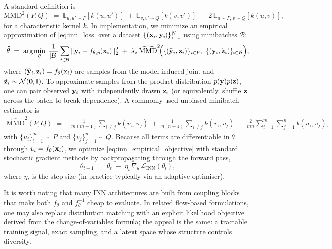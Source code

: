 A standard definition is
\begin{equation}
  \mathrm{MMD}^2(P,Q)
  \;=\;
  \mathbb{E}_{u,u'\sim P}[k(u,u')]
  \;+\;
  \mathbb{E}_{v,v'\sim Q}[k(v,v')]
  \;-\;
  2\,\mathbb{E}_{u\sim P,\ v\sim Q}[k(u,v)],
  \label{eq:mmd_def}
\end{equation}
for a characteristic kernel $k$. In implementation, we minimize an empirical approximation of \eqref{eq:inn_loss} over a dataset $\{(\mathbf{x}_i,\mathbf{y}_i)\}_{i=1}^{N}$ using minibatches $\mathcal{B}$:
\begin{equation}
  \widehat{\theta}
  \;=\;
  \arg\min_{\theta}\;
  \frac{1}{|\mathcal{B}|}\sum_{i\in\mathcal{B}}
  \|\vect{y}_i-f_{\theta,y}(\vect{x}_i)\|_2^2
  \;+\;
  \lambda_z\,
  \widehat{\mathrm{MMD}}^2\!\Big(\{(\widehat{\vect{y}}_i,\vect{z}_i)\}_{i\in\mathcal{B}},\ \{(\vect{y}_i,\tilde{\vect{z}}_i)\}_{i\in\mathcal{B}}\Big),
  \label{eq:inn_empirical_objective}
\end{equation}
where $(\widehat{\mathbf{y}}_i,\mathbf{z}_i)=f_\theta(\mathbf{x}_i)$ are samples from the model-induced joint and $\tilde{\mathbf{z}}_i\sim\mathcal{N}(\mathbf{0},\mathbf{I})$. To approximate samples from the product distribution $p(\mathbf{y})p(\mathbf{z})$, one can pair observed $\mathbf{y}_i$ with independently drawn $\tilde{\mathbf{z}}_i$ (or equivalently, shuffle $\mathbf{z}$ across the batch to break dependence). A commonly used unbiased minibatch estimator is
\begin{align}
  \widehat{\mathrm{MMD}}^2(P,Q)
  \;=\;&
  \frac{1}{m(m-1)}\sum_{i\neq j} k(u_i,u_j)
  \;+\;
  \frac{1}{n(n-1)}\sum_{i\neq j} k(v_i,v_j)
  \;-\;
  \frac{2}{mn}\sum_{i=1}^{m}\sum_{j=1}^{n} k(u_i,v_j),
  \label{eq:mmd_unbiased_estimator}
\end{align}
with $\{u_i\}_{i=1}^{m}\sim P$ and $\{v_j\}_{j=1}^{n}\sim Q$. Because all terms are differentiable in $\theta$ through $u_i=f_\theta(\mathbf{x}_i)$, we optimize \eqref{eq:inn_empirical_objective} with standard stochastic gradient methods by backpropagating through the forward pass,
\begin{equation}
  \theta_{t+1}
  \;=\;
  \theta_t \;-\; \eta_t\,\nabla_{\theta}\,\mathcal{L}_{\mathrm{INN}}(\theta_t),
  \label{eq:inn_sgd_update}
\end{equation}
where $\eta_t$ is the step size (in practice typically via an adaptive optimiser).

It is worth noting that many INN architectures are built from coupling blocks that make both $f_\theta$ and $f_\theta^{-1}$ cheap to evaluate. In related flow-based formulations, one may also replace distribution matching with an explicit likelihood objective derived from the change-of-variables formula; the appeal is the same: a tractable training signal, exact sampling, and a latent space whose structure controls diversity.

